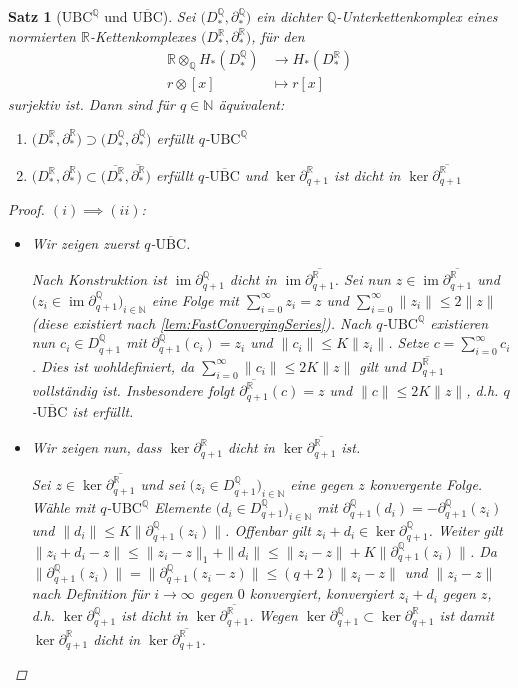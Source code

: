 \documentclass[a4paper,twoside,10pt]{scrreprt}
\DeclareMathOperator{\img}{im}
\newcommand{\UBC}{\text{UBC}}
\newcommand{\N}{\mathbb{N}}
\newcommand{\Q}{\mathbb{Q}}
\newcommand{\R}{\mathbb{R}}
\newtheorem{satz}{Satz}[section]
\theoremstyle{definition}
\begin{document}
\begin{satz}[$\UBC^{\Q}$ und $\overline{\UBC}$]\label{satz:UBCandDenseQSubcomplexes}
Sei $\bigl(D_*^{\Q},\partial_*^{\Q}\bigr)$ ein dichter $\Q$-Unterkettenkomplex eines normierten $\R$-Kettenkomplexes $\bigl(D_*^{\R},\partial_*^{\R}\bigr)$, für den
\begin{align*}
\R\otimes_{\Q}H_*(D_*^{\Q})&\to H_*(D_*^{\R})\\
r\otimes [x] &\mapsto r[x]
\end{align*}
surjektiv ist. Dann sind für $q\in\N$ äquivalent:
\renewcommand{\labelenumi}{(\roman{enumi})}
\begin{enumerate}
\item $\bigl(D_*^{\R},\partial_*^{\R}\bigr)\supset \bigl(D_*^{\Q},\partial_*^{\Q}\bigr)$ erfüllt $q$-$\text{UBC}^{\Q}$
\item $\bigl(D_*^{\R},\partial_*^{\R}\bigr)\subset\bigl(\overline{D_*^{\R}},\overline{\partial_*^{\R}}\bigr)$ erfüllt $q$-$\overline{\text{UBC}}$ und $\ker \partial_{q+1}^{\R}$ ist dicht in $\ker \overline{\partial_{q+1}^{\R}}$
\end{enumerate}
\begin{proof}
$(i)\implies (ii)$:\par
\begin{itemize}
\item Wir zeigen zuerst $q$-$\overline{\UBC}$.\par
Nach Konstruktion ist $\img \partial_{q+1}^{\Q}$ dicht in $\img \overline{\partial_{q+1}^{\R}}$. Sei nun $z\in \img \overline{\partial_{q+1}^{\R}}$ und $\bigl(z_i\in \img \partial_{q+1}^{\Q}\bigr)_{i\in \N}$ eine Folge mit $\sum\limits_{i=0}^{\infty}z_i=z$ und $\sum\limits_{i=0}^{\infty}\|z_i\|\leq 2\|z\|$ (diese existiert nach \cref{lem:FastConvergingSeries}). 
Nach $q$-$\UBC^{\Q}$ existieren nun $c_i\in D_{q+1}^{\Q}$ mit $\partial_{q+1}^{\Q}(c_i)=z_i$ und $\|c_i\|\leq K\|z_i\|$. Setze $c=\sum\limits_{i=0}^{\infty}c_i$. Dies ist wohldefiniert, da $\sum\limits_{i=0}^{\infty}\|c_i\|\leq 2K\|z\|$ gilt und $\overline{D_{q+1}^{\R}}$ vollständig ist. Insbesondere folgt $\overline{\partial_{q+1}^{\R}}(c)=z$ und $\|c\|\leq 2K\|z\|$, d.h. $q$-$\overline{\UBC}$ ist erfüllt.\par
\item Wir zeigen nun, dass $\ker \partial_{q+1}^{\R}$ dicht in $\ker \overline{\partial_{q+1}^{\R}}$ ist.\par
Sei $z\in \ker \overline{\partial_{q+1}^{\R}}$ und sei $\bigl(z_i\in D_{q+1}^{\Q}\bigr)_{i\in \N}$ eine gegen $z$ konvergente Folge. Wähle mit $q$-$\UBC^{\Q}$ Elemente $\bigl(d_i\in D_{q+1}^{\Q}\bigr)_{i\in \N}$ mit $\partial_{q+1}^{\Q}(d_i)=-\partial_{q+1}^{\Q}(z_i)$ und $\|d_i\|\leq K\|\partial_{q+1}^{\Q}(z_i)\|$. Offenbar gilt $z_i+d_i\in \ker \partial_{q+1}^{\Q}$. Weiter gilt $\|z_i+d_i-z\|\leq \|z_i-z\|_1+\|d_i\|\leq\|z_i-z\|+K\|\partial_{q+1}^{\Q}(z_i)\|$. Da $\|\partial_{q+1}^{\Q}(z_i)\|=\|\partial_{q+1}^{\Q}(z_i-z)\|\leq (q+2)\|z_i-z\|$ und $\|z_i-z\|$ nach Definition für $i\to \infty$ gegen $0$ konvergiert, konvergiert $z_i+d_i$ gegen $z$, d.h. $\ker \partial_{q+1}^{\Q}$ ist dicht in $\ker \overline{\partial_{q+1}^{\R}}$. Wegen $\ker \partial_{q+1}^{\Q}\subset\ker \partial_{q+1}^{\R}$ ist damit $\ker \partial_{q+1}^{\R}$ dicht in $\ker \overline{\partial_{q+1}^{\R}}$.

\end{itemize}
\end{proof}
\end{satz}
\end{document}
